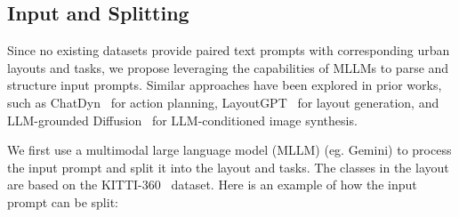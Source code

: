 \documentclass{article}
\begin{document}
\subsection{Input and Splitting}

Since no existing datasets provide paired text prompts with corresponding urban layouts and tasks, we propose leveraging the capabilities of MLLMs to parse and structure input prompts. Similar approaches have been explored in prior works, such as ChatDyn~\cite{wei2024chatdyn} for action planning, LayoutGPT~\cite{feng2023layoutgpt} for layout generation, and LLM-grounded Diffusion~\cite{lian2023llm} for LLM-conditioned image synthesis.

We first use a multimodal large language model (MLLM) (eg. Gemini) to process the input prompt and split it into the layout and tasks. The classes in the layout are based on the KITTI-360~\cite{liao2022kitti360} dataset. Here is an example of how the input prompt can be split:
\end{document}

